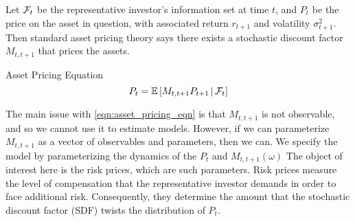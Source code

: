\documentclass[11pt, letterpaper, twoside, final]{article}
\begin{document}
Let $\mathcal{F}_t$ be the representative investor's information set at time $t$, and $P_t$ be the price on the asset in
question, with associated return $r_{t+1}$ and volatility  $\sigma^2_{t+1}$.
Then standard asset pricing theory says there exists a stochastic discount factor $M_{t,t+1}$ that prices the
assets. 





\begin{defn}{Asset Pricing Equation}\label{eqn:asset_pricing_eqn}
    \begin{equation}
        P_t  = \operatorname{\mathbb{E}}\left[M_{t,t+1} P_{t+1} \,\middle\vert\, \mathcal{F}_t \right] 
    \end{equation}
\end{defn}

The main issue with \cref{eqn:asset_pricing_eqn} is that $M_{t,t+1}$ is not observable, and so we cannot use it to
estimate models.
However, if we can parameterize $M_{t,t+1}$ as a vector of observables and parameters, then we can. 
We specify the model by parameterizing the dynamics of the $P_t$ and $M_{t, t+1}(\omega)$
The object of interest here is the risk prices, which are such parameters.
Risk prices measure the level of compensation that the representative investor demands in order to face additional
risk.
Consequently, they determine the amount that the stochastic discount factor (SDF) twists the distribution of
$P_t$. 
\end{document}
